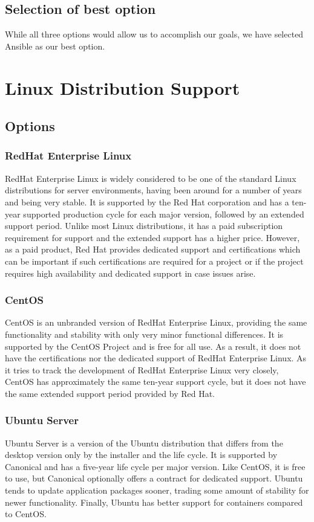 \documentclass[10pt,letterpaper,onecolumn,journal]{IEEEtran}
\begin{document}
\subsection{Selection of best option}
While all three options would allow us to accomplish our goals, we have selected Ansible as our best option.

\section{Linux Distribution Support}
\subsection{Options}
\subsubsection{RedHat Enterprise Linux}
RedHat Enterprise Linux is widely considered to be one of the standard Linux distributions for server environments, having been around for a number of years and being very stable. It is supported by the Red Hat corporation and has a ten-year supported production cycle for each major version, followed by an extended support period\cite{rhlife}. Unlike most Linux distributions, it has a paid subscription requirement for support and the extended support has a higher price. However, as a paid product, Red Hat provides dedicated support and certifications which can be important if such certifications are required for a project or if the project requires high availability and dedicated support in case issues arise.
\subsubsection{CentOS}
CentOS is an unbranded version of RedHat Enterprise Linux, providing the same functionality and stability with only very minor functional differences. It is supported by the CentOS Project and is free for all use. As a result, it does not have the certifications nor the dedicated support of RedHat Enterprise Linux. As it tries to track the development of RedHat Enterprise Linux very closely, CentOS has approximately the same ten-year support cycle\cite{centlife}, but it does not have the same extended support period provided by Red Hat.
\subsubsection{Ubuntu Server}
Ubuntu Server is a version of the Ubuntu distribution that differs from the desktop version only by the installer and the life cycle\cite{ubuntulife}. It is supported by Canonical and has a five-year life cycle per major version. Like CentOS, it is free to use, but Canonical optionally offers a contract for dedicated support. Ubuntu tends to update application packages sooner, trading some amount of stability for newer functionality. Finally, Ubuntu has better support for containers compared to CentOS.
\end{document}
